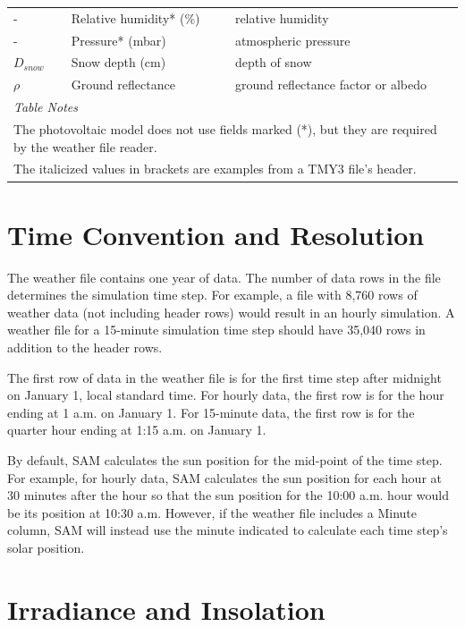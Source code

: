 \documentclass[12pt,letterpaper]{article}
\begin{document}
\begin{table}
\begin{center}
\begin{tabular}{lll}
- & Relative humidity* (\%) &  relative humidity \\
- & Pressure* (mbar) & atmospheric pressure \\
$D_{snow}$ & Snow depth (cm) & depth of snow \\
$\mathit{\rho}$ & Ground reflectance & ground reflectance factor or albedo \\
\midrule
\multicolumn{3}{l}{\textit{Table Notes}}\\
\multicolumn{3}{l}{The photovoltaic model does not use fields marked (*), but they are required by the weather file reader.}\\
\multicolumn{3}{l}{The italicized values in brackets are examples from a TMY3 file's header.}\\
\end{tabular}
\label{tab-wfdata}
\end{center}
\end{table}

\section{Time Convention and Resolution}

The weather file contains one year of data. The number of data rows in the file determines the simulation time step. For example, a file with 8,760 rows of weather data (not including header rows) would result in an hourly simulation. A weather file for a 15-minute simulation time step should have 35,040 rows in addition to the header rows.

The first row of data in the weather file is for the first time step after midnight on January 1, local standard time. For hourly data, the first row is for the hour ending at 1 a.m. on January 1. For 15-minute data, the first row is for the quarter hour ending at 1:15 a.m. on January 1.

By default, SAM calculates the sun position for the mid-point of the time step. For example, for hourly data, SAM calculates the sun position for each hour at 30 minutes after the hour so that the sun position for the 10:00 a.m. hour would be its position at 10:30 a.m. However, if the weather file includes a Minute column, SAM will instead use the minute indicated to calculate each time step's solar position.

\section{Irradiance and Insolation}
\end{document}
